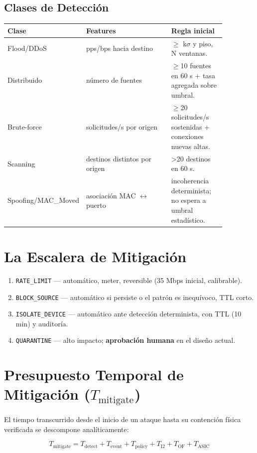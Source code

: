 \documentclass[11pt,a4paper]{report}
\begin{document}
\subsection{Clases de Detección}
\begin{longtable}{p{0.23\linewidth}p{0.39\linewidth}p{0.25\linewidth}}
\toprule
Clase & Features & Regla inicial \\
\midrule
Flood/DDoS & pps/bps hacia destino & $\geq$ k$\sigma$ y piso, N ventanas. \\
Distribuido & número de fuentes & $\geq$10 fuentes en 60 s + tasa agregada sobre umbral. \\
Brute-force & solicitudes/s por origen & $\geq$20 solicitudes/s sostenidas + conexiones nuevas altas. \\
Scanning & destinos distintos por origen & >20 destinos en 60 s. \\
Spoofing/MAC\_Moved & asociación MAC $\leftrightarrow$ puerto & incoherencia determinista; no espera a umbral estadístico. \\
\bottomrule
\end{longtable}

\section{La Escalera de Mitigación}
\begin{enumerate}
\item \texttt{RATE\_LIMIT} --- automático, meter, reversible (35 Mbps inicial, calibrable).
\item \texttt{BLOCK\_SOURCE} --- automático si persiste o el patrón es inequívoco, TTL corto.
\item \texttt{ISOLATE\_DEVICE} --- automático ante detección determinista, con TTL (10 min) y auditoría.
\item \texttt{QUARANTINE} --- alto impacto; \textbf{aprobación humana} en el diseño actual.
\end{enumerate}

\section{Presupuesto Temporal de Mitigación ($T_{\text{mitigate}}$)}
El tiempo transcurrido desde el inicio de un ataque hasta su contención física verificada se descompone analíticamente:

\begin{equation}
T_{\text{mitigate}} = T_{\text{detect}} + T_{\text{event}} + T_{\text{policy}} + T_{\text{I2}} + T_{\text{OF}} + T_{\text{ASIC}}
\end{equation}
\end{document}
